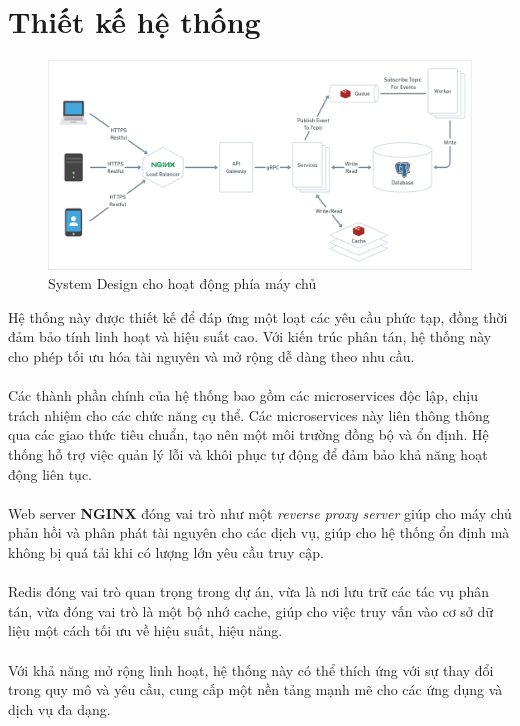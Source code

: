 \section{Thiết kế hệ thống}
\begin{figure}[h]
    \centering
    \includegraphics[scale = 0.21]{img/design/system.png}
    \vspace{1cm}
    \caption{System Design cho hoạt động phía máy chủ}
    \label{fig:taskAssignment}
\end{figure}
\noindent
Hệ thống này được thiết kế để đáp ứng một loạt các yêu cầu phức tạp, đồng thời đảm bảo tính linh hoạt và hiệu suất cao. Với kiến trúc phân tán, hệ thống này cho phép tối ưu hóa tài nguyên và mở rộng dễ dàng theo nhu cầu.\\
\\
Các thành phần chính của hệ thống bao gồm các microservices độc lập, chịu trách nhiệm cho các chức năng cụ thể. Các microservices này liên thông thông qua các giao thức tiêu chuẩn, tạo nên một môi trường đồng bộ và ổn định. Hệ thống hỗ trợ việc quản lý lỗi và khôi phục tự động để đảm bảo khả năng hoạt động liên tục.\\
\\
Web server \textbf{NGINX} đóng vai trò như một \textit{reverse proxy server} giúp cho máy chủ phản hồi và phân phát tài nguyên cho các dịch vụ, giúp cho hệ thống ổn định mà không bị quá tải khi có lượng lớn yêu cầu truy cập.\\
\\
Redis đóng vai trò quan trọng trong dự án, vừa là nơi lưu trữ các tác vụ phân tán, vừa đóng vai trò là một bộ nhớ cache, giúp cho việc truy vấn vào cơ sở dữ liệu một cách tối ưu về hiệu suất, hiệu năng.\\
\\
Với khả năng mở rộng linh hoạt, hệ thống này có thể thích ứng với sự thay đổi trong quy mô và yêu cầu, cung cấp một nền tảng mạnh mẽ cho các ứng dụng và dịch vụ đa dạng.
\newpage
